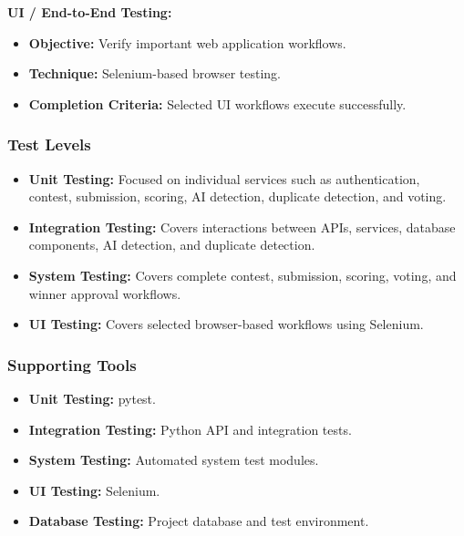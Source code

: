 \textbf{UI / End-to-End Testing:}
\begin{itemize}[leftmargin=1.5em, nosep]
    \item \textbf{Objective:} Verify important web application workflows.
    \item \textbf{Technique:} Selenium-based browser testing.
    \item \textbf{Completion Criteria:} Selected UI workflows execute successfully.
\end{itemize}

\subsubsection{Test Levels}
\label{subsubsec:test-strategy-levels}

\begin{itemize}[leftmargin=1.5em, nosep]
    \item \textbf{Unit Testing:} Focused on individual services such as authentication, contest, submission, scoring, AI detection, duplicate detection, and voting.
    \item \textbf{Integration Testing:} Covers interactions between APIs, services, database components, AI detection, and duplicate detection.
    \item \textbf{System Testing:} Covers complete contest, submission, scoring, voting, and winner approval workflows.
    \item \textbf{UI Testing:} Covers selected browser-based workflows using Selenium.
\end{itemize}

\subsubsection{Supporting Tools}
\label{subsubsec:supporting-tools}

\begin{itemize}[leftmargin=1.5em, nosep]
    \item \textbf{Unit Testing:} pytest.
    \item \textbf{Integration Testing:} Python API and integration tests.
    \item \textbf{System Testing:} Automated system test modules.
    \item \textbf{UI Testing:} Selenium.
    \item \textbf{Database Testing:} Project database and test environment.
\end{itemize}

